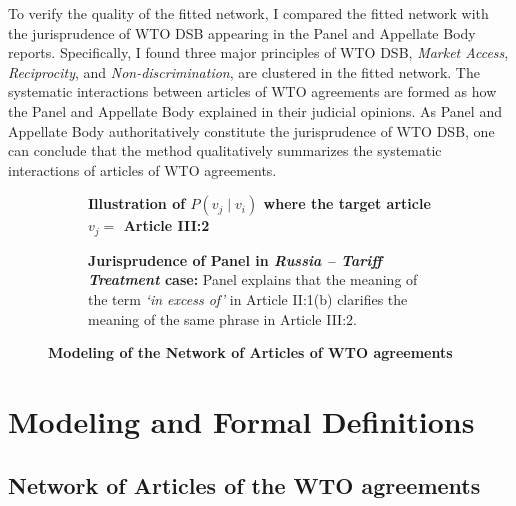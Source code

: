 To verify the quality of the fitted network, I compared the fitted network with the jurisprudence of WTO DSB appearing in the Panel and Appellate Body reports.
Specifically, I found three major principles of WTO DSB, \textit{Market Access}, \textit{Reciprocity}, and \textit{Non-discrimination}, are clustered in the fitted network.
The systematic interactions between articles of WTO agreements are formed as how the Panel and Appellate Body explained in their judicial opinions.
As Panel and Appellate Body authoritatively constitute the jurisprudence of WTO DSB, one can conclude that the method qualitatively summarizes the systematic interactions of articles of WTO agreements.
 
\begin{figure}[t!]
  \captionsetup[subfigure]{justification=centering}
  \begin{subfigure}[b]{1\textwidth}
      \centering{
          
      }
      \caption{\textbf{Illustration of $P(v_j \mid v_i)$ where the target article $v_j=$ Article III:2}}
      \label{subfig:a:art2b}
  \end{subfigure}
  \vfill
  \begin{subfigure}[b]{1\textwidth}
      \centering{
          
      }
      \centering
      \caption{\textbf{Jurisprudence of Panel in \textit{Russia – Tariff Treatment} case:} Panel explains that the meaning of the term \textit{`in excess of'} in Article II:1(b) clarifies the meaning of the same phrase in Article III:2.}
      \label{subfig:a:condprob}
  \end{subfigure}
  \caption{\textbf{Modeling of the Network of Articles of WTO agreements}}
  \label{fig:def-example}
\end{figure}

\section{Modeling and Formal Definitions}
\subsection{Network of Articles of the WTO agreements \label{subsec:def}}

